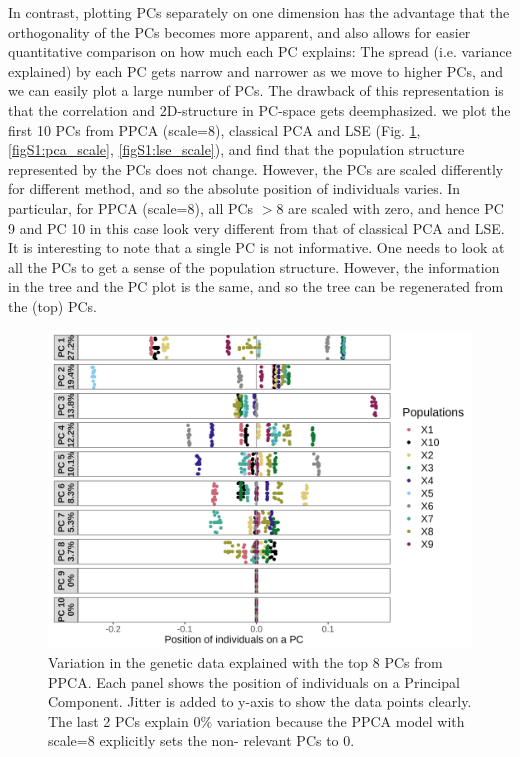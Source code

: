 \documentclass[12pt]{article}
\begin{document}
In contrast, plotting PCs separately on one dimension has the advantage that the orthogonality of the PCs becomes more apparent, and also allows for easier quantitative comparison on how much each PC explains: The spread (i.e. variance explained) by each PC gets narrow and narrower as we move to higher PCs, and we can easily plot a large number of PCs. The drawback of this representation is that the correlation and 2D-structure in PC-space gets deemphasized. we plot the first 10 PCs from PPCA (scale=8), classical PCA and LSE (Fig. \ref{figS1:ppca_scale}, \ref{figS1:pca_scale}, \ref{figS1:lse_scale}), and find that the population structure represented by the PCs does not change. However, the PCs are scaled differently for different method, and so the absolute position of individuals varies. In particular, for PPCA (scale=8), all PCs $>8$ are scaled with zero, and hence PC 9 and PC 10 in this case look very different from that of classical PCA and LSE.     
It is interesting to note that a single PC is not informative. One needs to look at all the PCs to get a sense of the population structure. However, the information in the tree and the PC plot is the same, and so the tree can be regenerated from the (top) PCs. 

\begin{figure}[ht!]
    \includegraphics[width=16.5cm]{Images/ppca/Supplement/pcplot2.png}
    \centering
    \caption{Variation in the genetic data explained with the top 8 PCs from PPCA. Each panel shows the position of individuals on a Principal Component. Jitter is added to y-axis to show the data points clearly. The last 2 PCs explain $0\%$ variation because the PPCA model with scale=8 explicitly sets the non- relevant PCs to 0.}
    \label{figS1:ppca_scale}
\end{figure}
\end{document}
